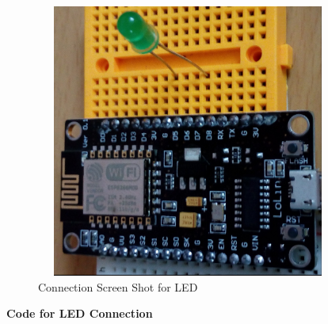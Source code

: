 \documentclass[12pt,a4paper]{article}
\begin{document}
\begin{figure}[h!]
    \centering
	\includegraphics[width=10cm, height=9cm]{Introduction/19.jpg}
	\caption{Connection Screen Shot for LED}
\end{figure}

\textbf{Code for LED Connection}\\
\end{document}
